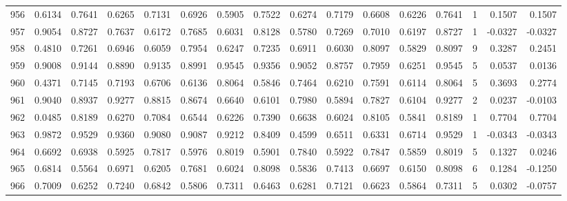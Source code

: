 \begin{tabular}{lrrrrrrrrrrrrrrr}
956 &      0.6134 &  0.7641 &  0.6265 &  0.7131 &  0.6926 &  0.5905 &  0.7522 &  0.6274 &  0.7179 &  0.6608 &   0.6226 &     0.7641 &      1 &                    0.1507 &                     0.1507 \\
957 &      0.9054 &  0.8727 &  0.7637 &  0.6172 &  0.7685 &  0.6031 &  0.8128 &  0.5780 &  0.7269 &  0.7010 &   0.6197 &     0.8727 &      1 &                   -0.0327 &                    -0.0327 \\
958 &      0.4810 &  0.7261 &  0.6946 &  0.6059 &  0.7954 &  0.6247 &  0.7235 &  0.6911 &  0.6030 &  0.8097 &   0.5829 &     0.8097 &      9 &                    0.3287 &                     0.2451 \\
959 &      0.9008 &  0.9144 &  0.8890 &  0.9135 &  0.8991 &  0.9545 &  0.9356 &  0.9052 &  0.8757 &  0.7959 &   0.6251 &     0.9545 &      5 &                    0.0537 &                     0.0136 \\
960 &      0.4371 &  0.7145 &  0.7193 &  0.6706 &  0.6136 &  0.8064 &  0.5846 &  0.7464 &  0.6210 &  0.7591 &   0.6114 &     0.8064 &      5 &                    0.3693 &                     0.2774 \\
961 &      0.9040 &  0.8937 &  0.9277 &  0.8815 &  0.8674 &  0.6640 &  0.6101 &  0.7980 &  0.5894 &  0.7827 &   0.6104 &     0.9277 &      2 &                    0.0237 &                    -0.0103 \\
962 &      0.0485 &  0.8189 &  0.6270 &  0.7084 &  0.6544 &  0.6226 &  0.7390 &  0.6638 &  0.6024 &  0.8105 &   0.5841 &     0.8189 &      1 &                    0.7704 &                     0.7704 \\
963 &      0.9872 &  0.9529 &  0.9360 &  0.9080 &  0.9087 &  0.9212 &  0.8409 &  0.4599 &  0.6511 &  0.6331 &   0.6714 &     0.9529 &      1 &                   -0.0343 &                    -0.0343 \\
964 &      0.6692 &  0.6938 &  0.5925 &  0.7817 &  0.5976 &  0.8019 &  0.5901 &  0.7840 &  0.5922 &  0.7847 &   0.5859 &     0.8019 &      5 &                    0.1327 &                     0.0246 \\
965 &      0.6814 &  0.5564 &  0.6971 &  0.6205 &  0.7681 &  0.6024 &  0.8098 &  0.5836 &  0.7413 &  0.6697 &   0.6150 &     0.8098 &      6 &                    0.1284 &                    -0.1250 \\
966 &      0.7009 &  0.6252 &  0.7240 &  0.6842 &  0.5806 &  0.7311 &  0.6463 &  0.6281 &  0.7121 &  0.6623 &   0.5864 &     0.7311 &      5 &                    0.0302 &                    -0.0757 \\

\end{tabular}
